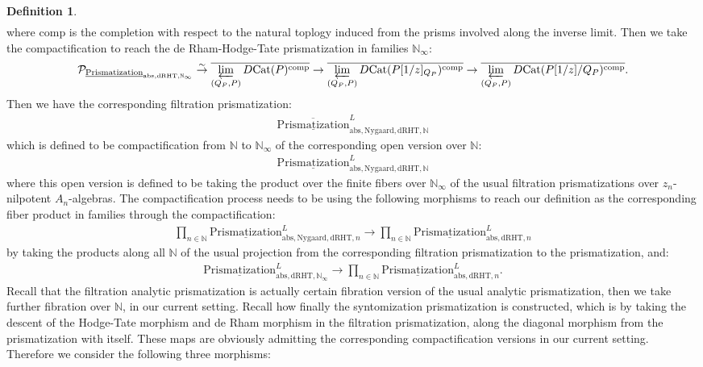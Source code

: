 \documentclass[12pt]{article}
\theoremstyle{definition}
\newtheorem{definition}{Definition}
\begin{document}
\begin{definition}
\begin{align}
\end{align}
where $\mathrm{comp}$ is the completion with respect to the natural toplogy induced from the prisms involved along the inverse limit. Then we take the compactification to reach the de Rham-Hodge-Tate prismatization in families $\mathbb{N}_\infty$:
\begin{align}
\mathcal{P}_{\underline{\mathrm{Prismatization}}_{\mathrm{abs},\mathrm{dRHT},\mathbb{N}_\infty}} \overset{\sim}{\rightarrow} \overline{\varprojlim_{(Q_P,P)} D\mathrm{Cat}(P)^\mathrm{comp}}\rightarrow \overline{\varprojlim_{(Q_P,P)} D\mathrm{Cat}(P[1/z]_{Q_P})^\mathrm{comp}}\rightarrow \overline{\varprojlim_{(Q_P,P)} D\mathrm{Cat}(P[1/z]/{Q_P})^\mathrm{comp}}.
\end{align}
Then we have the corresponding filtration prismatization:
\begin{align}
\overline{\underline{\mathrm{Prismatization}}}^L_{\mathrm{abs},\mathrm{Nygaard},\mathrm{dRHT},\mathbb{N}}
\end{align}
which is defined to be compactification from $\mathbb{N}$ to $\mathbb{N}_\infty$ of the corresponding open version over $\mathbb{N}$:
\begin{align}
{\underline{\mathrm{Prismatization}}}^L_{\mathrm{abs},\mathrm{Nygaard},\mathrm{dRHT},\mathbb{N}}
\end{align}
where this open version is defined to be taking the product over the finite fibers over $\mathbb{N}_\infty$ of the usual filtration prismatizations over $z_n$-nilpotent $A_n$-algebras. The compactification process needs to be using the following morphisms to reach our definition as the corresponding fiber product in families through the compactification:
\begin{align}
\prod_{n\in \mathbb{N}} {\underline{\mathrm{Prismatization}}}^L_{\mathrm{abs},\mathrm{Nygaard},\mathrm{dRHT},n}\rightarrow  \prod_{n\in \mathbb{N}} {\underline{\mathrm{Prismatization}}}^L_{\mathrm{abs},\mathrm{dRHT},n}
\end{align}
by taking the products along all $\mathbb{N}$ of the usual projection from the corresponding filtration prismatization to the prismatization, and:
\begin{align}
{\underline{\mathrm{Prismatization}}}^L_{\mathrm{abs},\mathrm{dRHT},\mathbb{N}_\infty}\rightarrow  \prod_{n\in \mathbb{N}} {\underline{\mathrm{Prismatization}}}^L_{\mathrm{abs},\mathrm{dRHT},n}.
\end{align}
Recall that the filtration analytic prismatization is actually certain fibration version of the usual analytic prismatization, then we take further fibration over $\mathbb{N}$, in our current setting. Recall how finally the syntomization prismatization is constructed, which is by taking the descent of the Hodge-Tate morphism and de Rham morphism in the filtration prismatization, along the diagonal morphism from the prismatization with itself. These maps are obviously admitting the corresponding compactification versions in our current setting. Therefore we consider the following three morphisms:

\end{definition}
\end{document}
